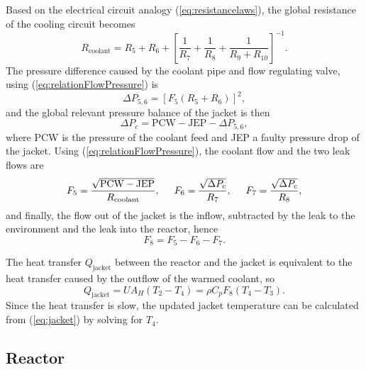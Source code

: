 \documentclass[10pt, conference, compsocconf]{IEEEtran}
\newcommand{\refeq}[1]{(\ref{eq:#1})}
\begin{document}
Based on the electrical circuit analogy \refeq{resistancelaws},
the global resistance of the cooling circuit becomes
\begin{equation}
R_{\text{coolant}} = R_{5}+R_{6}+
\left[\frac{1}{R_{7}}+\frac{1}{R_{8}}+\frac{1}{R_{9}+R_{10}}\right]^{-1}.
\label{eq:Rcoolant}
\end{equation}
The pressure difference caused by the coolant pipe and flow
regulating valve, using \refeq{relationFlowPressure} is
\begin{equation*}
\Delta P_{5,6} = \left[F_{5}(R_{5}+R_{6})\right]^{2},
\label{eq:jacketinpressure}
\end{equation*}
and the global relevant pressure balance of the jacket is
then
\begin{equation*}
\Delta P_{c} = \text{PCW}-\text{JEP}-\Delta P_{5,6},
\label{eq:jacketpressurebal}
\end{equation*}
where PCW is the pressure of the coolant feed and
JEP a faulty pressure drop of the jacket.
Using \refeq{relationFlowPressure}, the coolant flow and the
two leak flows are
\begin{align*}
F_{5} = \frac{\sqrt{\text{PCW}-\text{JEP}}}{R_{\text{coolant}}},
\hspace{0.5cm} %
F_{6} = \frac{\sqrt{\Delta P_{c}}}{R_{7}}, \hspace{0.5cm}
	F_{7}= \frac{\sqrt{\Delta P_{c}}}{R_{8}}, %
\label{eq:jacketflow}
\end{align*}
and finally, the flow out of the jacket is the inflow, subtracted by
the leak to the environment and the leak into the reactor, hence
\begin{equation*}
F_{8} = F_{5}-F_{6}-F_{7}.
\label{eq:jacketmassbal}
\end{equation*}

The heat transfer $Q_{\text{jacket}}$ between the reactor and the jacket
is equivalent to the heat transfer caused by the outflow of
the warmed coolant, so
\begin{equation}
Q_{\text{jacket}} = U A_{H}(T_{2}-T_{4}) = \rho C_{p}F_{8}(T_{4}-T_{3}).
\label{eq:jacket}
\end{equation}
Since the heat transfer is slow, the updated jacket temperature can
be calculated from \refeq{jacket} by solving for $T_{4}$.


\subsection{Reactor}\label{appendix:cstrmodeleq}
\end{document}
